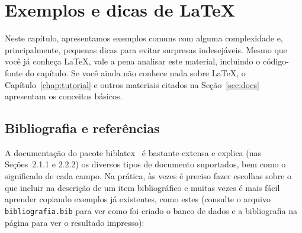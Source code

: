
\chapter{Exemplos e dicas de \LaTeX{}}
\label{chap:exemplos}

Neste capítulo, apresentamos exemplos comuns com alguma complexidade e,
principalmente, pequenas dicas para evitar surpresas indesejáveis. Mesmo
que você já conheça \LaTeX{}, vale a pena analisar este material, incluindo
o código-fonte do capítulo. Se você ainda não conhece nada sobre \LaTeX{},
o Capítulo~\ref{chap:tutorial} e outros materiais citados na
Seção~\ref{sec:docs} apresentam os conceitos básicos.

\section{Bibliografia e referências}
\label{sec:exemplos-biblatex}

A documentação do pacote biblatex~\citep{biblatex} é
bastante extensa e explica (nas Seções~2.1.1 e 2.2.2) os diversos
tipos de documento suportados, bem como o significado de cada campo.
Na prática, às vezes é preciso fazer escolhas sobre
o que incluir na descrição de um item bibliográfico e muitas vezes
é mais fácil aprender copiando exemplos já existentes, como estes (consulte o
arquivo \texttt{bibliografia.bib} para ver como foi criado o banco de dados e a
bibliografia na página \pageref{sec:bib} para ver o resultado impresso):


